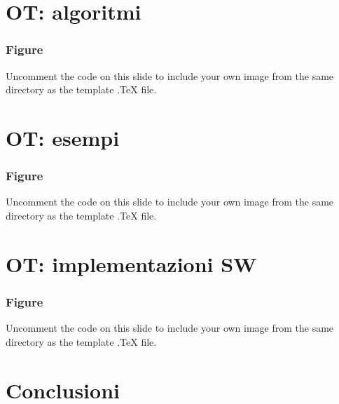 \documentclass{beamer}
\begin{document}
\section{OT: algoritmi}



\begin{frame}
	\frametitle{Figure}
	Uncomment the code on this slide to include your own image from the same directory as the template .TeX file.
\end{frame}


\section{OT: esempi}



\begin{frame}
	\frametitle{Figure}
	Uncomment the code on this slide to include your own image from the same directory as the template .TeX file.
\end{frame}

\section{OT: implementazioni SW}


\begin{frame}
	\frametitle{Figure}
	Uncomment the code on this slide to include your own image from the same directory as the template .TeX file.
\end{frame}



\section{Conclusioni}
\end{document}
